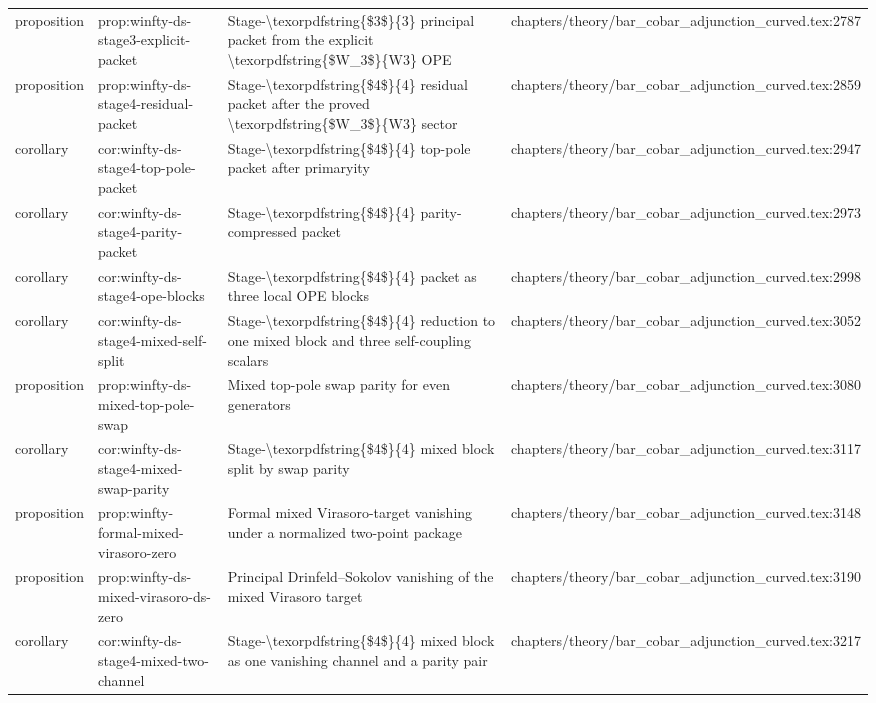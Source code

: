 \documentclass[11pt]{article}
\begin{document}
\begin{longtable}{L{0.10\textwidth}L{0.26\textwidth}L{0.42\textwidth}L{0.22\textwidth}}
proposition & prop:winfty-ds-stage3-explicit-packet & Stage-\textbackslash{}texorpdfstring\{\$3\$\}\{3\} principal packet from the explicit \textbackslash{}texorpdfstring\{\$W\_3\$\}\{W3\} OPE & chapters/theory/bar\_cobar\_adjunction\_curved.tex:2787\\
proposition & prop:winfty-ds-stage4-residual-packet & Stage-\textbackslash{}texorpdfstring\{\$4\$\}\{4\} residual packet after the proved \textbackslash{}texorpdfstring\{\$W\_3\$\}\{W3\} sector & chapters/theory/bar\_cobar\_adjunction\_curved.tex:2859\\
corollary & cor:winfty-ds-stage4-top-pole-packet & Stage-\textbackslash{}texorpdfstring\{\$4\$\}\{4\} top-pole packet after primaryity & chapters/theory/bar\_cobar\_adjunction\_curved.tex:2947\\
corollary & cor:winfty-ds-stage4-parity-packet & Stage-\textbackslash{}texorpdfstring\{\$4\$\}\{4\} parity-compressed packet & chapters/theory/bar\_cobar\_adjunction\_curved.tex:2973\\
corollary & cor:winfty-ds-stage4-ope-blocks & Stage-\textbackslash{}texorpdfstring\{\$4\$\}\{4\} packet as three local OPE blocks & chapters/theory/bar\_cobar\_adjunction\_curved.tex:2998\\
corollary & cor:winfty-ds-stage4-mixed-self-split & Stage-\textbackslash{}texorpdfstring\{\$4\$\}\{4\} reduction to one mixed block and three self-coupling scalars & chapters/theory/bar\_cobar\_adjunction\_curved.tex:3052\\
proposition & prop:winfty-ds-mixed-top-pole-swap & Mixed top-pole swap parity for even generators & chapters/theory/bar\_cobar\_adjunction\_curved.tex:3080\\
corollary & cor:winfty-ds-stage4-mixed-swap-parity & Stage-\textbackslash{}texorpdfstring\{\$4\$\}\{4\} mixed block split by swap parity & chapters/theory/bar\_cobar\_adjunction\_curved.tex:3117\\
proposition & prop:winfty-formal-mixed-virasoro-zero & Formal mixed Virasoro-target vanishing under a normalized two-point package & chapters/theory/bar\_cobar\_adjunction\_curved.tex:3148\\
proposition & prop:winfty-ds-mixed-virasoro-ds-zero & Principal Drinfeld--Sokolov vanishing of the mixed Virasoro target & chapters/theory/bar\_cobar\_adjunction\_curved.tex:3190\\
corollary & cor:winfty-ds-stage4-mixed-two-channel & Stage-\textbackslash{}texorpdfstring\{\$4\$\}\{4\} mixed block as one vanishing channel and a parity pair & chapters/theory/bar\_cobar\_adjunction\_curved.tex:3217\\

\end{longtable}
\end{document}
